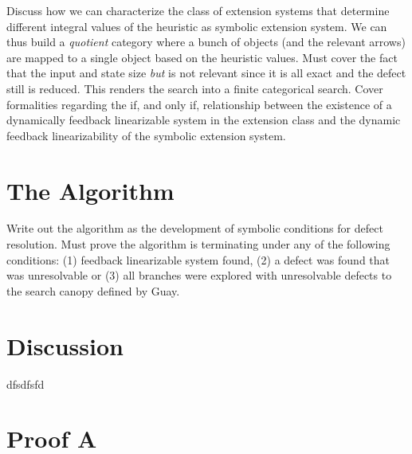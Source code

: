 \documentclass[review,hidelinks,onefignum,onetabnum]{siamart251216}
\begin{document}
Discuss how we can characterize the class of extension systems that determine different integral values of the heuristic as symbolic extension system.
We can thus build a \emph{quotient} category where a bunch of objects (and the relevant arrows) are mapped to a single object based on the heuristic values.
Must cover the fact that the input and state size \emph{but} is not relevant since it is all exact and the defect still is reduced.
This renders the search into a finite categorical search.
Cover formalities regarding the if, and only if, relationship between the existence of a dynamically feedback linearizable system in the extension class and the dynamic feedback linearizability of the symbolic extension system.

\section{The Algorithm}
Write out the algorithm as the development of symbolic conditions for defect resolution.
Must prove the algorithm is terminating under any of the following conditions: (1) feedback linearizable system found, (2) a defect was found that was unresolvable or (3) all branches were explored with unresolvable defects to the search canopy defined by Guay.

\section{Discussion}
dfsdfsfd

\appendix
\section{Proof A}
\end{document}
